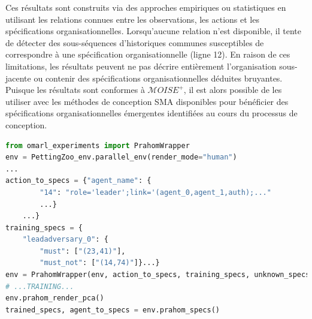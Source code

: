 \documentclass[demonstration]{jfsma}
\newcounter{relation}
\begin{document}
Ces résultats sont construits via des approches empiriques ou statistiques en utilisant les relations connues entre les observations, les actions et les spécifications organisationnelles. Lorsqu'aucune relation n'est disponible, il tente de détecter des sous-séquences d'historiques communes susceptibles de correspondre à une spécification organisationnelle (ligne 12). En raison de ces limitations, les résultats peuvent ne pas décrire entièrement l’organisation sous-jacente ou contenir des spécifications organisationnelles déduites bruyantes. Puisque les résultats sont conformes à $\mathcal{M}OISE^+$, il est alors possible de les utiliser avec les méthodes de conception SMA disponibles pour bénéficier des spécifications organisationnelles émergentes identifiées au cours du processus de conception.

\begin{lstlisting}[language=Python, caption={Utilisation basique de \emph{PRAHOM PettingZoo Wrapper}}, label={lst:wrapper_basic_use}]
from omarl_experiments import PrahomWrapper
env = PettingZoo_env.parallel_env(render_mode="human")
...
action_to_specs = {"agent_name": {
        "14": "role='leader';link='(agent_0,agent_1,auth);..."
        ...}    
    ...}
training_specs = {
    "leadadversary_0": {
        "must": ["(23,41)"],
        "must_not": ["(14,74)"]}...}
env = PrahomWrapper(env, action_to_specs, training_specs, unknown_specs_inference=True, pca_output=True)
# ...TRAINING...
env.prahom_render_pca()
trained_specs, agent_to_specs = env.prahom_specs()
\end{lstlisting}


\end{document}

